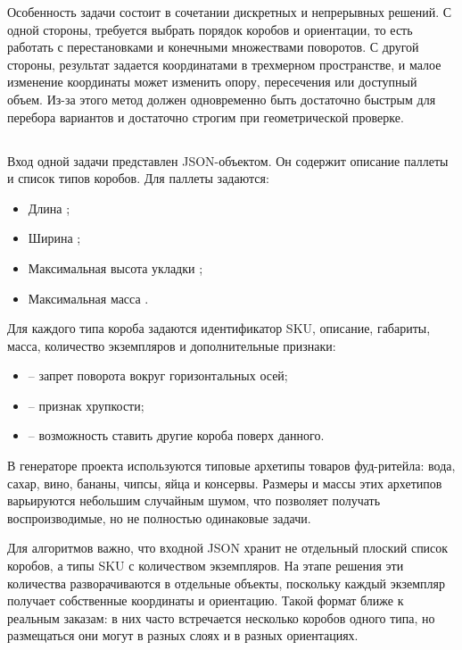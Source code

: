 Особенность задачи состоит в сочетании дискретных и непрерывных решений. С одной стороны, требуется выбрать порядок коробов и ориентации, то есть работать с перестановками и конечными множествами поворотов. С другой стороны, результат задается координатами в трехмерном пространстве, и малое изменение координаты может изменить опору, пересечения или доступный объем. Из-за этого метод должен одновременно быть достаточно быстрым для перебора вариантов и достаточно строгим при геометрической проверке.

\subsection{}

Вход одной задачи представлен JSON-объектом. Он содержит описание паллеты и список типов коробов. Для паллеты задаются:
\begin{itemize}
  \item Длина ;
  \item Ширина ;
  \item Максимальная высота укладки ;
  \item Максимальная масса .
\end{itemize}

Для каждого типа короба задаются идентификатор SKU, описание, габариты, масса, количество экземпляров и дополнительные признаки:
\begin{itemize}
  \item {} -- запрет поворота вокруг горизонтальных осей;
  \item {} -- признак хрупкости;
  \item {} -- возможность ставить другие короба поверх данного.
\end{itemize}

В генераторе проекта используются типовые архетипы товаров фуд-ритейла: вода, сахар, вино, бананы, чипсы, яйца и консервы. Размеры и массы этих архетипов варьируются небольшим случайным шумом, что позволяет получать воспроизводимые, но не полностью одинаковые задачи.

Для алгоритмов важно, что входной JSON хранит не отдельный плоский список коробов, а типы SKU с количеством экземпляров. На этапе решения эти количества разворачиваются в отдельные объекты, поскольку каждый экземпляр получает собственные координаты и ориентацию. Такой формат ближе к реальным заказам: в них часто встречается несколько коробов одного типа, но размещаться они могут в разных слоях и в разных ориентациях.

